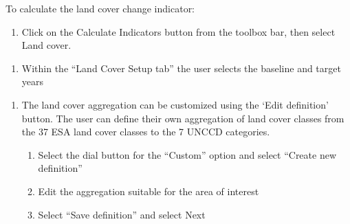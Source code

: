 \documentclass[letterpaper,10pt,english]{sphinxmanual}
\begin{document}
\sphinxAtStartPar
To calculate the land cover change indicator:
\begin{enumerate}
%
\item {} 
\sphinxAtStartPar
Click on the Calculate Indicators button from the toolbox bar, then select
Land cover.

\end{enumerate}

\begin{enumerate}
%
\setcounter{enumi}{1}
\item {} 
\sphinxAtStartPar
Within the “Land Cover Setup tab” the user selects the baseline and target years

\end{enumerate}

\begin{enumerate}
%
\setcounter{enumi}{2}
\item {} 
\sphinxAtStartPar
The land cover aggregation can be customized using the ‘Edit definition’
button. The user can define their own aggregation of land cover classes from
the 37 ESA land cover classes to the 7 UNCCD categories.
\begin{enumerate}
%
\item {} 
\sphinxAtStartPar
Select the dial button for the “Custom” option and select “Create new
definition”

\item {} 
\sphinxAtStartPar
Edit the aggregation suitable for the area of interest

\item {} 
\sphinxAtStartPar
Select “Save definition” and select Next

\end{enumerate}

\end{enumerate}
\end{document}
